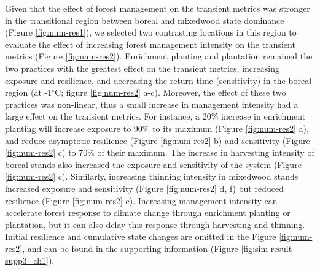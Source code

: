 Given that the effect of forest management on the transient metrics was
stronger in the transitional region between boreal and mixedwood state
dominance (Figure \ref{fig:num-res1}), we selected two contrasting
locations in this region to evaluate the effect of increasing forest
management intensity on the transient metrics (Figure
\ref{fig:num-res2}). Enrichment planting and plantation remained the two
practices with the greatest effect on the transient metrics, increasing
exposure and resilience, and decreasing the return time (sensitivity) in
the boreal region (at -1\(^{\circ}\)C; figure \ref{fig:num-res2} a-c).
Moreover, the effect of these two practices was non-linear, thus a small
increase in management intensity had a large effect on the transient
metrics. For instance, a 20\% increase in enrichment planting will
increase exposure to 90\% to its maximum (Figure \ref{fig:num-res2} a),
and reduce asymptotic resilience (Figure \ref{fig:num-res2} b) and
sensitivity (Figure \ref{fig:num-res2} c) to 70\% of their maximum. The
increase in harvesting intensity of boreal stands also increased the
exposure and sensitivity of the system (Figure \ref{fig:num-res2} c).
Similarly, increasing thinning intensity in mixedwood stands increased
exposure and sensitivity (Figure \ref{fig:num-res2} d, f) but reduced
resilience (Figure \ref{fig:num-res2} e). Increasing management
intensity can accelerate forest response to climate change through
enrichment planting or plantation, but it can also delay this response
through harvesting and thinning. Initial resilience and cumulative state
changes are omitted in the Figure \ref{fig:num-res2}, and can be found
in the supporting information (Figure \ref{fig:sim-result-supp3_ch1}).\\

